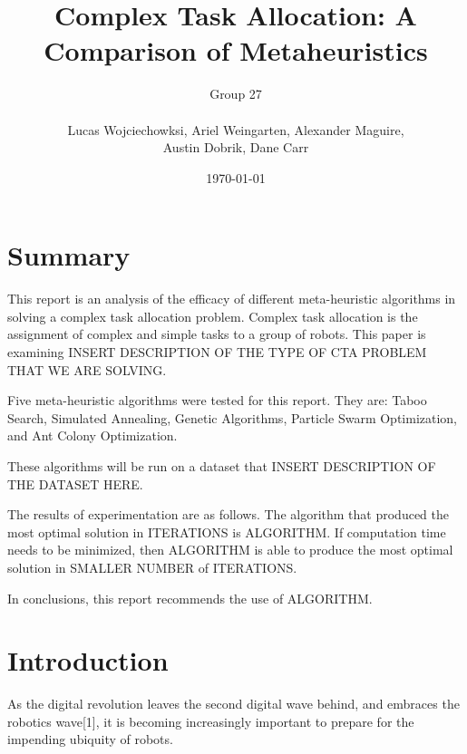 \documentclass[a4paper]{article}
\title{Complex Task Allocation: A Comparison of Metaheuristics}
\author{
	Group 27 \\
	\\
	Lucas Wojciechowksi, Ariel Weingarten, Alexander Maguire, \\
	Austin Dobrik, Dane Carr}
\date{\today}
\begin{document}
\maketitle


\section*{Summary}
This report is an analysis of the efficacy of different meta-heuristic algorithms in solving a complex task allocation problem.
Complex task allocation is the assignment of complex and simple tasks to a group of robots. This paper is examining INSERT DESCRIPTION OF THE TYPE OF CTA PROBLEM THAT WE ARE SOLVING.

Five meta-heuristic algorithms were tested for this report. They are: Taboo Search, Simulated Annealing, Genetic Algorithms, Particle Swarm Optimization, and Ant Colony Optimization.

These algorithms will be run on a dataset that INSERT DESCRIPTION OF THE DATASET HERE.

The results of experimentation are as follows. The algorithm that produced the most optimal solution in ITERATIONS is ALGORITHM.
If computation time needs to be minimized, then ALGORITHM is able to produce the most optimal solution in SMALLER NUMBER of ITERATIONS.

In conclusions, this report recommends the use of ALGORITHM.

\section{Introduction}
As the digital revolution leaves the second digital wave behind, and embraces the robotics wave[1], it is becoming increasingly important to prepare for the impending ubiquity of robots.
\end{document}
